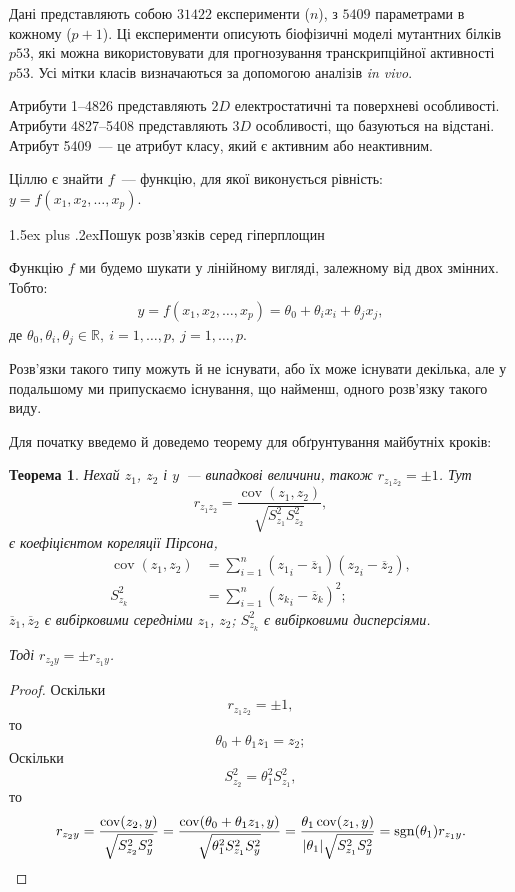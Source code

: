 \documentclass[12pt,a4paper]{article}
\makeatletter
\renewcommand{\section}{\@startsection{section}{1}{18pt}{3.25ex plus 1ex minus 0.2ex}%
{1.5ex plus .2ex}{\bfseries\rmfamily\Large}}
\theoremstyle{myplain}
\newtheorem{theorem}{Теорема}[section]
\numberwithin{equation}{section}
\newcommand{\sgn}{\operatorname{sgn}}
\newcommand{\cov}{\operatorname{cov}}
\makeatother
\begin{document}
Дані представляють собою $31422$ експерименти ($n$), з $5409$ параметрами в кожному ($p + 1$). Ці експерименти описують біофізичні моделі мутантних білків $p53$, які можна використовувати для прогнозування транскрипційної активності $p53$. Усі мітки класів визначаються за допомогою аналізів \textit{in vivo}.

Атрибути 1--4826 представляють $2D$ електростатичні та поверхневі особливості. Атрибути 4827--5408 представляють $3D$ особливості, що базуються на відстані. Атрибут 5409~--- це атрибут класу, який є активним або неактивним.

Ціллю є знайти $f$~--- функцію, для якої виконується рівність: $y = f(x_1, x_2, \ldots , x_p)$. 

\section{Пошук розв'язків серед гіперплощин}

Функцію $f$ ми будемо шукати у лінійному вигляді, залежному від двох змінних. Тобто:
\begin{align}
y = f(x_1, x_2, \ldots , x_p) = \theta_0 + \theta_i x_i + \theta_j x_j, \label{Pair_linear}
\end{align}
де $\theta_0, \theta_i, \theta_j \in\mathbb{R},~i = 1, \ldots , p,~j = 1, \ldots , p$.

Розв'язки такого типу можуть й не існувати, або їх може існувати декілька, але у подальшому ми припускаємо існування, що найменш, одного розв'язку такого виду.

Для початку введемо й доведемо теорему для обґрунтування майбутніх кроків:
\begin{theorem}
Нехай $ z_1 $, $ z_2 $ і $ y $~--- випадкові величини, також $ r_{z_1 z_2} = \pm 1 $. Тут 
$$ 
r_{z_1 z_2}=\frac{\cov(z_1 , z_2)}{\sqrt{S^2_{z_1}S^2_{z_2}}}, 
$$
є коефіцієнтом кореляції Пірсона,
\begin{align*}
\cov(z_1 , z_2)& = \sum_{i=1}^{n}({z_1}_i - \overline{z}_1)({z_2}_i - \overline{z}_2),
\\
S_{z_k}^2& = \sum_{i=1}^{n}({z_k}_i - \overline{z}_k)^2;
\end{align*} 
$\overline{z}_1, \overline{z}_2$ є вибірковими середніми $ z_1 $, $ z_2 $; $S_{z_k}^2$ є вибірковими дисперсіями.

Тоді $ r_{z_2 y} = \pm r_{z_1 y} $.
\end{theorem}

\begin{proof}
Оскільки
$$
r_{z_1 z_2} = \pm 1,
$$
то
$$
 \theta_0 + \theta_1 z_1 = z_2;
$$
Оскільки
$$
S^2_{z_2} = \theta^2_1 S^2_{z_1},
$$
то
$$
r_{z_2 y} = \frac{\cov(z_2 , y)}{\sqrt{S^2_{z_2}S^2_y}} = \frac{\cov(\theta_0 + \theta_1 z_1 , y)}{\sqrt{\theta^2_1 S^2_{z_1}S^2_y}}
= \frac{\theta_1 \cov(z_1 , y)}{|\theta_1| \sqrt{S^2_{z_1}S^2_y}} = \sgn(\theta_1) r_{z_1 y}.\qedhere
$$
\end{proof}
\end{document}
